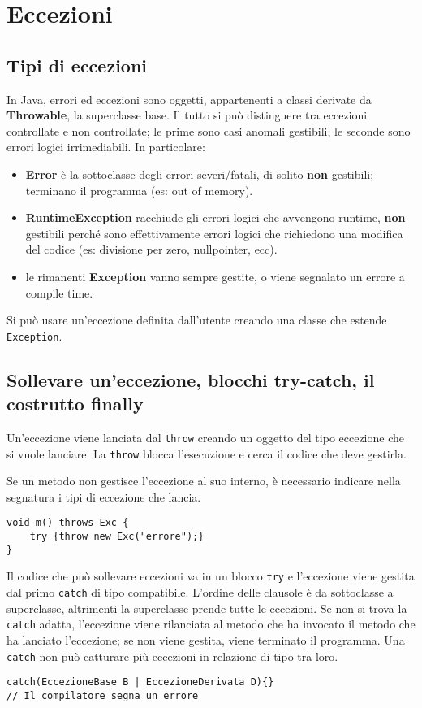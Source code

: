 \chapter{Eccezioni}

\section{Tipi di eccezioni}
In Java, errori ed eccezioni sono oggetti, appartenenti a classi derivate da \textbf{Throwable}, la superclasse base. Il tutto si può distinguere tra eccezioni controllate e non controllate; le prime sono casi anomali gestibili, le seconde sono errori logici irrimediabili.
In particolare:
\begin{itemize}
\item \textbf{Error} è la sottoclasse degli errori severi/fatali, di solito \textbf{non} gestibili; terminano il programma (es: out of memory).
\item \textbf{RuntimeException} racchiude gli errori logici che avvengono runtime, \textbf{non} gestibili perché sono effettivamente errori logici che richiedono una modifica del codice (es: divisione per zero, nullpointer, ecc).
\item le rimanenti \textbf{Exception} vanno sempre gestite, o viene segnalato un errore a compile time.
\end{itemize}
Si può usare un'eccezione definita dall'utente creando una classe che estende \texttt{Exception}.

\section{Sollevare un'eccezione, blocchi try-catch, il costrutto finally}
Un'eccezione viene lanciata dal \texttt{throw} creando un oggetto del tipo eccezione che si vuole lanciare. La \texttt{throw} blocca l'esecuzione e cerca il codice che deve gestirla.

Se un metodo non gestisce l'eccezione al suo interno, è necessario indicare nella segnatura i tipi di eccezione che lancia.
\begin{lstlisting}
void m() throws Exc {
    try {throw new Exc("errore");}
}
\end{lstlisting}

Il codice che può sollevare eccezioni va in un blocco \texttt{try} e l'eccezione viene gestita dal primo \texttt{catch} di tipo compatibile. L'ordine delle clausole è da sottoclasse a superclasse, altrimenti la superclasse prende tutte le eccezioni. Se non si trova la \texttt{catch} adatta, l'eccezione viene rilanciata al metodo che ha invocato il metodo che ha lanciato l'eccezione; se non viene gestita, viene terminato il programma. Una \texttt{catch} non può catturare più eccezioni in relazione di tipo tra loro.
\begin{lstlisting}
catch(EccezioneBase B | EccezioneDerivata D){}
// Il compilatore segna un errore
\end{lstlisting}


